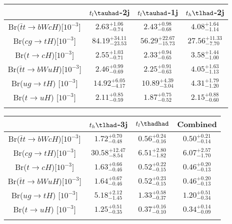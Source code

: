 \centering
\begin{tabular}{cccc} \toprule\toprule
 & $t_l\tauhad$-2j & $t_l\tauhad$-1j & $t_h\tlhad$-2j\\\midrule
Br($\bar{t}t\to bWcH$)[$10^{-3}$]    & $2.63^{+1.06}_{-0.74}$ & $2.43^{+0.98}_{-0.68}$ & $4.08^{+1.64}_{-1.14}$\\
Br($cg\to tH$)[$10^{-3}]$            & $84.19^{+34.11}_{-23.53}$ & $56.29^{+22.67}_{-15.73}$ & $27.56^{+11.33}_{-7.70}$\\
Br($t\to cH$)[$10^{-3}$]             & $2.55^{+1.03}_{-0.71}$ & $2.33^{+0.94}_{-0.65}$ & $3.58^{+1.44}_{-1.00}$\\
Br($\bar{t}t\to bWuH$)[$10^{-3}$]    & $2.46^{+0.99}_{-0.69}$ & $2.25^{+0.91}_{-0.63}$ & $4.05^{+1.63}_{-1.13}$\\
Br($ug\to tH$) [$10^{-3}$]           & $14.92^{+6.05}_{-4.17}$ & $10.89^{+4.39}_{-3.04}$ & $4.31^{+1.79}_{-1.20}$\\
Br($t\to uH$)  [$10^{-3}$]           & $2.11^{+0.85}_{-0.59}$ & $1.87^{+0.75}_{-0.52}$ & $2.15^{+0.88}_{-0.60}$\\
\bottomrule\bottomrule\\
\end{tabular}
\begin{tabular}{cccc} \toprule\toprule
 & $t_h\tlhad$-3j & $t_l\thadhad$ & Combined\\\midrule
Br($\bar{t}t\to bWcH$)[$10^{-3}$]    & $1.72^{+0.70}_{-0.48}$ & $0.56^{+0.24}_{-0.16}$ & $0.50^{+0.21}_{-0.14}$\\
Br($cg\to tH$)[$10^{-3}]$            & $30.58^{+12.47}_{-8.54}$ & $6.51^{+2.80}_{-1.82}$ & $6.07^{+2.57}_{-1.70}$\\
Br($t\to cH$)[$10^{-3}$]             & $1.63^{+0.66}_{-0.46}$ & $0.52^{+0.22}_{-0.15}$ & $0.46^{+0.20}_{-0.13}$\\
Br($\bar{t}t\to bWuH$)[$10^{-3}$]    & $1.64^{+0.67}_{-0.46}$ & $0.52^{+0.23}_{-0.15}$ & $0.46^{+0.20}_{-0.13}$\\
Br($ug\to tH$) [$10^{-3}$]           & $5.18^{+2.12}_{-1.45}$ & $1.33^{+0.58}_{-0.37}$ & $1.20^{+0.51}_{-0.34}$\\
Br($t\to uH$)  [$10^{-3}$]           & $1.25^{+0.51}_{-0.35}$ & $0.37^{+0.16}_{-0.10}$ & $0.34^{+0.14}_{-0.09}$\\
\bottomrule\bottomrule\\
\end{tabular}